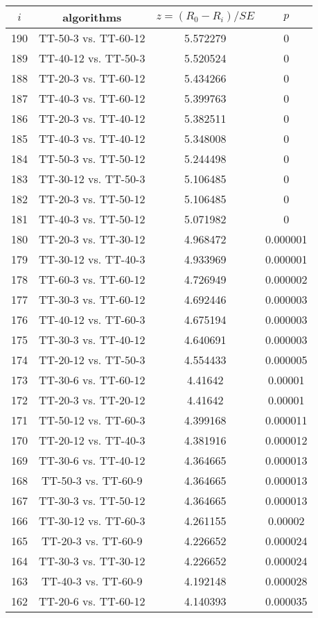 \documentclass[a4paper,10pt]{article}
\begin{document}
\begin{landscape}
\begin{table}[!htp]
\centering\scriptsize
\begin{tabular}{cccc}
$i$&algorithms&$z=(R_0 - R_i)/SE$&$p$\\
\hline190&TT-50-3 vs. TT-60-12&5.572279&0\\
189&TT-40-12 vs. TT-50-3&5.520524&0\\
188&TT-20-3 vs. TT-60-12&5.434266&0\\
187&TT-40-3 vs. TT-60-12&5.399763&0\\
186&TT-20-3 vs. TT-40-12&5.382511&0\\
185&TT-40-3 vs. TT-40-12&5.348008&0\\
184&TT-50-3 vs. TT-50-12&5.244498&0\\
183&TT-30-12 vs. TT-50-3&5.106485&0\\
182&TT-20-3 vs. TT-50-12&5.106485&0\\
181&TT-40-3 vs. TT-50-12&5.071982&0\\
180&TT-20-3 vs. TT-30-12&4.968472&0.000001\\
179&TT-30-12 vs. TT-40-3&4.933969&0.000001\\
178&TT-60-3 vs. TT-60-12&4.726949&0.000002\\
177&TT-30-3 vs. TT-60-12&4.692446&0.000003\\
176&TT-40-12 vs. TT-60-3&4.675194&0.000003\\
175&TT-30-3 vs. TT-40-12&4.640691&0.000003\\
174&TT-20-12 vs. TT-50-3&4.554433&0.000005\\
173&TT-30-6 vs. TT-60-12&4.41642&0.00001\\
172&TT-20-3 vs. TT-20-12&4.41642&0.00001\\
171&TT-50-12 vs. TT-60-3&4.399168&0.000011\\
170&TT-20-12 vs. TT-40-3&4.381916&0.000012\\
169&TT-30-6 vs. TT-40-12&4.364665&0.000013\\
168&TT-50-3 vs. TT-60-9&4.364665&0.000013\\
167&TT-30-3 vs. TT-50-12&4.364665&0.000013\\
166&TT-30-12 vs. TT-60-3&4.261155&0.00002\\
165&TT-20-3 vs. TT-60-9&4.226652&0.000024\\
164&TT-30-3 vs. TT-30-12&4.226652&0.000024\\
163&TT-40-3 vs. TT-60-9&4.192148&0.000028\\
162&TT-20-6 vs. TT-60-12&4.140393&0.000035\\

\end{tabular}
\end{table}
\end{landscape}
\end{document}
